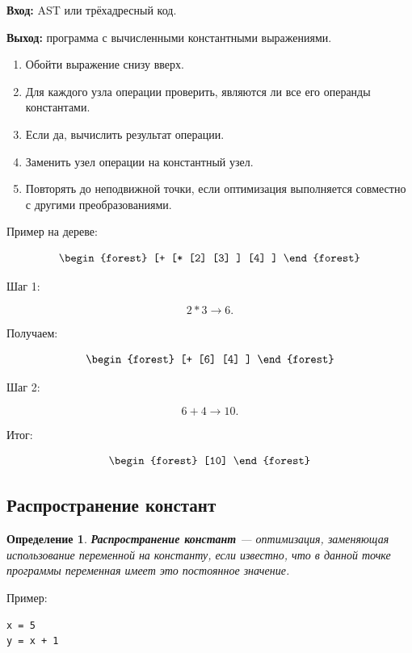 \documentclass[12pt,a4paper]{article}
\newtheorem{definition}{Определение}
\begin{document}
\textbf{Вход:} AST или трёхадресный код.

\textbf{Выход:} программа с вычисленными константными выражениями.

\begin{enumerate}
    \item Обойти выражение снизу вверх.
    \item Для каждого узла операции проверить, являются ли все его операнды константами.
    \item Если да, вычислить результат операции.
    \item Заменить узел операции на константный узел.
    \item Повторять до неподвижной точки, если оптимизация выполняется совместно с другими преобразованиями.
\end{enumerate}

Пример на дереве:

\[
\begin{forest}
[+
    [*
        [2]
        [3]
    ]
    [4]
]
\end{forest}
\]

Шаг 1:

\[
2 * 3 \to 6.
\]

Получаем:

\[
\begin{forest}
[+
    [6]
    [4]
]
\end{forest}
\]

Шаг 2:

\[
6 + 4 \to 10.
\]

Итог:

\[
\begin{forest}
[10]
\end{forest}
\]

\subsection{Распространение констант}

\begin{definition}
\textbf{Распространение констант} --- оптимизация, заменяющая использование переменной на константу, если известно, что в данной точке программы переменная имеет это постоянное значение.
\end{definition}

Пример:

\begin{lstlisting}
x = 5
y = x + 1
\end{lstlisting}
\end{document}

